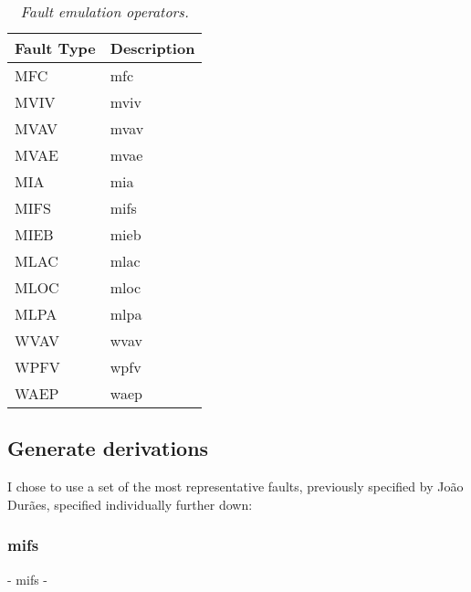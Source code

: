 \begin{table}[!ht]
\begin{tabular}{|l|p{12cm}|}
\hline
\textbf{Fault Type}		& \multicolumn{1}{c|}{\textbf{Description}}		\\ \hline \hline
MFC        				& \Acl{mfc}  									\\ \hline
MVIV       				& \Acl{mviv} 									\\ \hline
MVAV       				& \Acl{mvav} 									\\ \hline
MVAE       				& \Acl{mvae} 									\\ \hline
MIA        				& \Acl{mia}  									\\ \hline
MIFS       				& \Acl{mifs} 									\\ \hline
MIEB       				& \Acl{mieb} 									\\ \hline
MLAC       				& \Acl{mlac} 									\\ \hline
MLOC       				& \Acl{mloc} 									\\ \hline
MLPA       				& \Acl{mlpa} 									\\ \hline
WVAV       				& \Acl{wvav} 									\\ \hline
WPFV       				& \Acl{wpfv} 									\\ \hline
WAEP       				& \Acl{waep} 									\\ \hline
\end{tabular}
\caption{\small \sl Fault emulation operators.\label{tab:faultEmulationOperators}}
\end{table}


\subsection{Generate derivations}

I chose to use a set of the most representative faults, previously specified by João Durães\cite{duraes2006emulation}, specified individually further down:

	\hypertarget{mifs}{}
	\subsubsection{\textbf{\acs{mifs}}} - \Acl{mifs} - 

